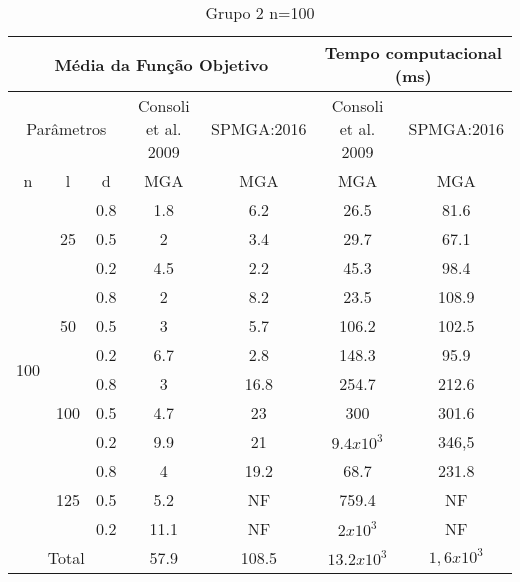 \documentclass[12pt]{article}
\begin{document}
\begin{table}[]
\centering
\caption{Grupo 2 n=100}
\label{my-label}
\begin{tabular}{|c|c|c|c|c|c|c|}
\hline
\multicolumn{5}{|c|}{Média da Função Objetivo}                                       & \multicolumn{2}{c|}{Tempo computacional (ms)} \\ \hline
\multicolumn{3}{|c|}{Parâmetros}                   & Consoli et al. 2009 & SPMGA:2016 & Consoli et al. 2009        & SPMGA:2016        \\ \hline
n                     & l                    & d   & MGA               & MGA         & MGA                      & MGA                \\ \hline
\multirow{12}{*}{100} & \multirow{3}{*}{25}  & 0.8 & 1.8               & 6.2         & 26.5                     & 81.6               \\ \cline{3-7} 
                      &                      & 0.5 & 2                 & 3.4         & 29.7                     & 67.1               \\ \cline{3-7} 
                      &                      & 0.2 & 4.5               & 2.2         & 45.3                     & 98.4               \\ \cline{2-7} 
                      & \multirow{3}{*}{50}  & 0.8 & 2                 & 8.2         & 23.5                     & 108.9              \\ \cline{3-7} 
                      &                      & 0.5 & 3                 & 5.7         & 106.2                    & 102.5              \\ \cline{3-7} 
                      &                      & 0.2 & 6.7               & 2.8         & 148.3                    & 95.9               \\ \cline{2-7} 
                      & \multirow{3}{*}{100} & 0.8 & 3                 & 16.8        & 254.7                    & 212.6              \\ \cline{3-7} 
                      &                      & 0.5 & 4.7               & 23          & 300                      & 301.6              \\ \cline{3-7} 
                      &                      & 0.2 & 9.9               & 21          & $9.4x10^3$               & 346,5              \\ \cline{2-7} 
                      & \multirow{3}{*}{125} & 0.8 & 4                 & 19.2        & 68.7                     & 231.8              \\ \cline{3-7} 
                      &                      & 0.5 & 5.2               & NF          & 759.4                    & NF                 \\ \cline{3-7} 
                      &                      & 0.2 & 11.1              & NF          & $2x10^3$                 & NF                 \\ \hline
\multicolumn{3}{|c|}{Total}                        & 57.9              & 108.5       & $13.2x10^3$              & $1,6x10^3$         \\ \hline
\end{tabular}
\end{table}
\end{document}
